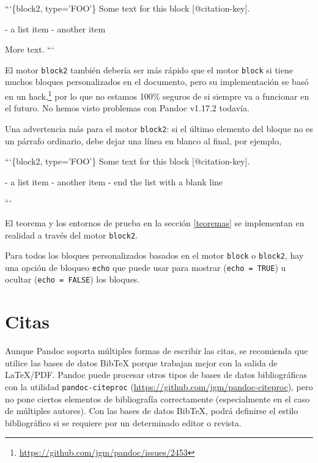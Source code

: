 \documentclass[12pt,]{krantz}
\makeatletter
\newenvironment{Shaded}{\begin{snugshade}}{\end{snugshade}}
\newcommand{\FloatTok}[1]{\textcolor[rgb]{0.00,0.00,0.81}{{#1}}}
\newcommand{\NormalTok}[1]{{#1}}
\renewcommand{\href}[2]{#2\footnote{\url{#1}}}
\newenvironment{kframe}{%
\medskip{}
\setlength{\fboxsep}{.8em}
 \def\at@end@of@kframe{}%
 \ifinner\ifhmode%
  \def\at@end@of@kframe{\end{minipage}}%
  \begin{minipage}{\columnwidth}%
 \fi\fi%
 \def\FrameCommand##1{\hskip\@totalleftmargin \hskip-\fboxsep
 \colorbox{shadecolor}{##1}\hskip-\fboxsep
     \hskip-\linewidth \hskip-\@totalleftmargin \hskip\columnwidth}%
 \MakeFramed {\advance\hsize-\width
   \@totalleftmargin\z@ \linewidth\hsize
   \@setminipage}}%
 {\par\unskip\endMakeFramed%
 \at@end@of@kframe}
\renewenvironment{Shaded}{\begin{kframe}}{\end{kframe}}
\theoremstyle{definition}
\theoremstyle{definition}
\theoremstyle{remark}
\makeatother
\begin{document}
\begin{Shaded}
\begin{Highlighting}[]
\NormalTok{```\{block2, type='FOO'\}}
\NormalTok{Some text for this block [@citation-key].}

\NormalTok{- }\FloatTok{a list item}
\FloatTok{- another item}

\FloatTok{More text.}
\FloatTok{```}
\end{Highlighting}
\end{Shaded}

El motor \texttt{block2} también debería ser más rápido que el motor
\texttt{block} si tiene muchos bloques personalizados en el documento,
pero su implementación se basó en
\href{https://github.com/jgm/pandoc/issues/2453}{un hack,} por lo que no
estamos 100\% seguros de si siempre va a funcionar en el futuro. No
hemos visto problemas con Pandoc v1.17.2 todavía.

Una advertencia más para el motor \texttt{block2}: si el último elemento
del bloque no es un párrafo ordinario, debe dejar una línea en blanco al
final, por ejemplo,

\begin{Shaded}
\begin{Highlighting}[]
\NormalTok{```\{block2, type='FOO'\}}
\NormalTok{Some text for this block [@citation-key].}

\NormalTok{- }\FloatTok{a list item}
\FloatTok{- another item}
\FloatTok{- end the list with a blank line}

\FloatTok{```}
\end{Highlighting}
\end{Shaded}

El teorema y los entornos de prueba en la sección \ref{teoremas} se
implementan en realidad a través del motor \texttt{block2}.

Para todos los bloques personalizados basados en el motor \texttt{block}
o \texttt{block2}, hay una opción de bloqueo \texttt{echo} que puede
usar para mostrar (\texttt{echo\ =\ TRUE}) u ocultar
(\texttt{echo\ =\ FALSE}) los bloques.

\section{Citas}\label{citas}

Aunque Pandoc soporta múltiples formas de escribir las citas, se
recomienda que utilice las bases de datos BibTeX porque trabajan mejor
con la salida de LaTeX/PDF. Pandoc puede procesar otros tipos de bases
de datos bibliográficas con la utilidad \texttt{pandoc-citeproc}
(\url{https://github.com/jgm/pandoc-citeproc}), pero no pone ciertos
elementos de bibliografía correctamente (especialmente en el caso de
múltiples autores). Con las bases de datos BibTeX, podrá definirse el
estilo bibliográfico si se requiere por un determinado editor o revista.
\end{document}
